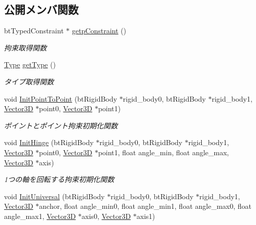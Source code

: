 \subsection*{公開メンバ関数}
\begin{DoxyCompactItemize}
\item 
bt\+Typed\+Constraint $\ast$ \mbox{\hyperlink{class_bullet_physics_constraint_a9b010a354abcc093e48dc66edb1e22b7}{getp\+Constraint}} ()
\begin{DoxyCompactList}\small\item\em 拘束取得関数 \end{DoxyCompactList}\item 
\mbox{\hyperlink{class_bullet_physics_constraint_ad85080d0a6ff58365f4f6fa4c9381e24}{Type}} \mbox{\hyperlink{class_bullet_physics_constraint_a6d2bcb7b7a32a5ca14210a577a613b91}{get\+Type}} ()
\begin{DoxyCompactList}\small\item\em タイプ取得関数 \end{DoxyCompactList}\item 
void \mbox{\hyperlink{class_bullet_physics_constraint_aeb6ae98f37a54a32ef2999064733f078}{Init\+Point\+To\+Point}} (bt\+Rigid\+Body $\ast$rigid\+\_\+body0, bt\+Rigid\+Body $\ast$rigid\+\_\+body1, \mbox{\hyperlink{class_vector3_d}{Vector3D}} $\ast$point0, \mbox{\hyperlink{class_vector3_d}{Vector3D}} $\ast$point1)
\begin{DoxyCompactList}\small\item\em ポイントとポイント拘束初期化関数 \end{DoxyCompactList}\item 
void \mbox{\hyperlink{class_bullet_physics_constraint_acc6efb5b423b1be8d1dfb5d1d4aee394}{Init\+Hinge}} (bt\+Rigid\+Body $\ast$rigid\+\_\+body0, bt\+Rigid\+Body $\ast$rigid\+\_\+body1, \mbox{\hyperlink{class_vector3_d}{Vector3D}} $\ast$point0, \mbox{\hyperlink{class_vector3_d}{Vector3D}} $\ast$point1, float angle\+\_\+min, float angle\+\_\+max, \mbox{\hyperlink{class_vector3_d}{Vector3D}} $\ast$axis)
\begin{DoxyCompactList}\small\item\em 1つの軸を回転する拘束初期化関数 \end{DoxyCompactList}\item 
void \mbox{\hyperlink{class_bullet_physics_constraint_a779d7b52cd6c630c580e1500053c1ccb}{Init\+Universal}} (bt\+Rigid\+Body $\ast$rigid\+\_\+body0, bt\+Rigid\+Body $\ast$rigid\+\_\+body1, \mbox{\hyperlink{class_vector3_d}{Vector3D}} $\ast$anchor, float angle\+\_\+min0, float angle\+\_\+min1, float angle\+\_\+max0, float angle\+\_\+max1, \mbox{\hyperlink{class_vector3_d}{Vector3D}} $\ast$axis0, \mbox{\hyperlink{class_vector3_d}{Vector3D}} $\ast$axis1)

\end{DoxyCompactItemize}
